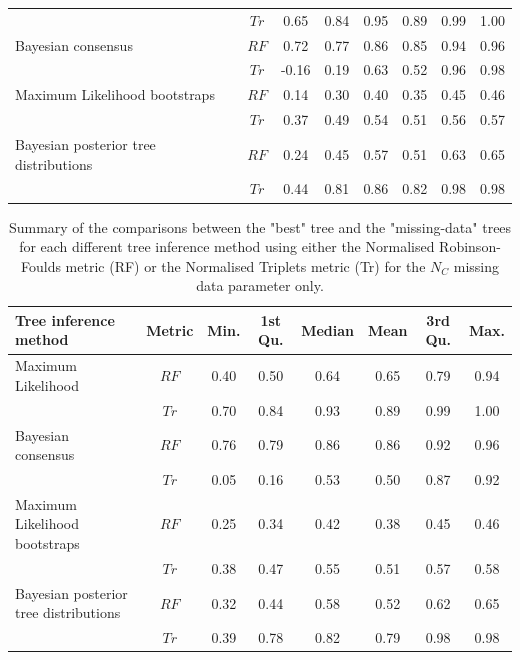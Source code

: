 \begin{landscape}
\begin{table}[!hb]
\begin{tabular}{lccccccc}
                                        & $Tr$ & 0.65 & 0.84 & 0.95 & 0.89 & 0.99 & 1.00 \\ 
  Bayesian consensus                    & $RF$ & 0.72 & 0.77 & 0.86 & 0.85 & 0.94 & 0.96 \\ 
                                        & $Tr$ & -0.16 & 0.19 & 0.63 & 0.52 & 0.96 & 0.98 \\ 
  Maximum Likelihood bootstraps         & $RF$ & 0.14 & 0.30 & 0.40 & 0.35 & 0.45 & 0.46 \\ 
                                        & $Tr$ & 0.37 & 0.49 & 0.54 & 0.51 & 0.56 & 0.57 \\ 
  Bayesian posterior tree distributions & $RF$ & 0.24 & 0.45 & 0.57 & 0.51 & 0.63 & 0.65 \\ 
                                        & $Tr$ & 0.44 & 0.81 & 0.86 & 0.82 & 0.98 & 0.98 \\ 
   \hline
\end{tabular}
\end{table}
\end{landscape}

\begin{landscape}
\begin{table}[!htb]
\caption[Summary of the tree comparisons for the $N_{C}$ parameter.]{Summary of the comparisons between the "best" tree and the "missing-data" trees for each different tree inference method using either the Normalised Robinson-Foulds metric (RF) or the Normalised Triplets metric (Tr) for the $N_{C}$ missing data parameter only.}
\label{Tab_Supp_summary_metric_MC}
\centering
\begin{tabular}{lccccccc}
  \hline
 Tree inference method & Metric & Min. & 1st Qu. & Median & Mean & 3rd Qu. & Max. \\ 
  \hline
  Maximum Likelihood                    & $RF$ & 0.40 & 0.50 & 0.64 & 0.65 & 0.79 & 0.94 \\ 
                                        & $Tr$ & 0.70 & 0.84 & 0.93 & 0.89 & 0.99 & 1.00 \\ 
  Bayesian consensus                    & $RF$ & 0.76 & 0.79 & 0.86 & 0.86 & 0.92 & 0.96 \\ 
                                        & $Tr$ & 0.05 & 0.16 & 0.53 & 0.50 & 0.87 & 0.92 \\ 
  Maximum Likelihood bootstraps         & $RF$ & 0.25 & 0.34 & 0.42 & 0.38 & 0.45 & 0.46 \\ 
                                        & $Tr$ & 0.38 & 0.47 & 0.55 & 0.51 & 0.57 & 0.58 \\ 
  Bayesian posterior tree distributions & $RF$ & 0.32 & 0.44 & 0.58 & 0.52 & 0.62 & 0.65 \\ 
                                        & $Tr$ & 0.39 & 0.78 & 0.82 & 0.79 & 0.98 & 0.98 \\ 
   \hline
\end{tabular}
\end{table}
\end{landscape}

